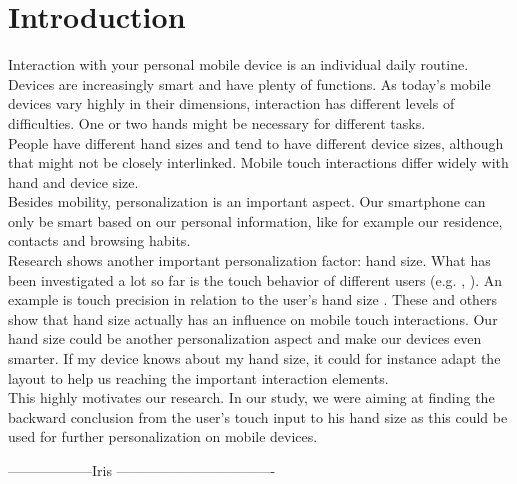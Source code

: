 \documentclass{sigchi}
\begin{document}
\section{Introduction}
Interaction with your personal mobile device is an individual daily routine. Devices are increasingly smart and have plenty of functions. As today's mobile devices vary highly in their dimensions, interaction has different levels of difficulties. One or two hands might be necessary for different tasks.\\
People have different hand sizes and tend to have different device sizes, although that might not be closely interlinked. Mobile touch interactions differ widely with hand and device size.\\
Besides mobility, personalization is an important aspect. Our smartphone can only be smart based on our personal information, like for example our residence, contacts and browsing habits.\\ %
Research shows another important personalization factor: hand size. What has been investigated a lot so far is the touch behavior of different users (e.g. \cite{parhi2006target}, \cite{buschek2015touchml}). An example is touch precision in relation to the user's hand size \cite{parhi2006target}. These and others show that hand size actually has an influence on mobile touch interactions. Our hand size could be another personalization aspect and make our devices even smarter. If my device knows about my hand size, it could for instance adapt the layout to help us reaching the important interaction elements.\\
This highly motivates our research. In our study, we were aiming at finding the backward conclusion from the user's touch input to his hand size as this could be used for further personalization on mobile devices.

------------------Iris ----------------------------------
\end{document}
